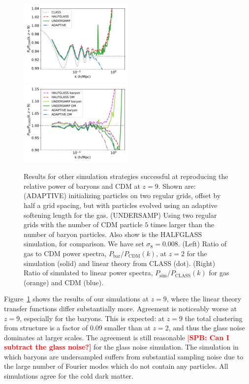\documentclass[a4paper,11pt]{article}
\newcommand{\spb}[1]{\textcolor{red}{[\bf SPB: #1]} }
\begin{document}
\begin{figure}
\includegraphics[width=0.5\textwidth]{plots/oversample_9_relpower.pdf}
  \includegraphics[width=0.5\textwidth]{plots/oversample_9_class.pdf}
\caption{Results for other simulation strategies successful at reproducing the relative power of baryons and CDM at $z=9$. Shown are: (ADAPTIVE) initializing particles on two regular grids, offset by half a grid spacing, but with particles evolved using an adaptive softening length for the gas. (UNDERSAMP) Using two regular grids with the number of CDM particle $5$ times larger than the number of baryon particles. Also show is the HALFGLASS simulation, for comparison. We have set $\sigma_8 = 0.008$. (Left) Ratio of gas to CDM power spectra, $P_\mathrm{bar}/P_\mathrm{CDM}(k)$, at $z=2$ for the simulation (solid) and linear theory from CLASS (dot). (Right) Ratio of simulated to linear power spectra, $P_\mathrm{sim}/P_\mathrm{CLASS}(k)$ for gas (orange) and CDM (blue).}
  \label{fig:adaptivez9}
\end{figure}

Figure~\ref{fig:adaptivez9} shows the results of our simulations at $z=9$, where the linear theory transfer functions differ substantially more. Agreement is noticeably worse at $z=9$, especially for the baryons. This is expected: at $z=9$ the total clustering from structure is a factor of $0.09$ smaller than at $z=2$, and thus the  glass noise dominates at larger scales. The agreement is still reasonable \spb{Can I subtract the glass noise?} for the glass noise simulation. The simulation in which baryons are undersampled suffers from substantial sampling noise due to the large number of Fourier modes which do not contain any particles. All simulations agree for the cold dark matter.
\end{document}
